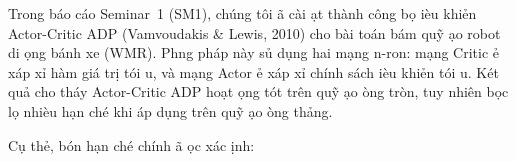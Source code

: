 \documentclass[12pt,a4paper]{article}
\begin{document}
Trong b\'{a}o c\'{a}o Seminar~1 (SM1), ch\'{u}ng t\^{o}i \dj\~{a} c\`{a}i \dj\d{a}t th\`{a}nh c\^{o}ng b\d{o} \dj i\`{e}u khi\h{e}n Actor-Critic ADP (Vamvoudakis \& Lewis, 2010) cho b\`{a}i to\'{a}n b\'{a}m qu\~{y} \dj\d{a}o robot di \dj\d{o}ng b\'{a}nh xe (WMR). Ph\uhorn{}\ohorn{}ng ph\'{a}p n\`{a}y s\h{u} d\d{u}ng hai m\d{a}ng n\ohorn{}-ron: m\d{a}ng Critic \dj\h{e} x\'{a}p x\h{i} h\`{a}m gi\'{a} tr\d{i} t\'{o}i \uhorn{}u, v\`{a} m\d{a}ng Actor \dj\h{e} x\'{a}p x\h{i} ch\'{i}nh s\'{a}ch \dj i\`{e}u khi\h{e}n t\'{o}i \uhorn{}u. K\'{e}t qu\h{a} cho th\'{a}y Actor-Critic ADP ho\d{a}t \dj\d{o}ng t\'{o}t tr\^{e}n qu\~{y} \dj\d{a}o \dj\uhorn{}\`{o}ng tr\`{o}n, tuy nhi\^{e}n b\d{o}c l\d{o} nhi\`{e}u h\d{a}n ch\'{e} khi \'{a}p d\d{u}ng tr\^{e}n qu\~{y} \dj\d{a}o \dj\uhorn{}\`{o}ng th\h{a}ng.

C\d{u} th\h{e}, b\'{o}n h\d{a}n ch\'{e} ch\'{i}nh \dj\~{a} \dj\uhorn{}\d{o}c x\'{a}c \dj\d{i}nh:
\end{document}
